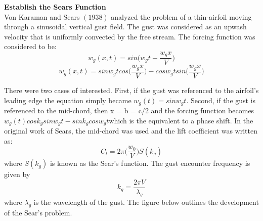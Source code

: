 \documentclass{article}
\begin{document}
\noindent \textbf{Establish the Sears Function}\\

\noindent Von Karaman and Sears $(1938)$ analyzed the problem of a thin-airfoil moving through a sinusoidal vertical gust field. The gust was considered as an upwash velocity that is uniformly convected by the free stream. The forcing function was considered to be: 
\begin{equation}
w_g(x,t) = sin\Bigg(w_gt - \frac{w_gx}{V}\Bigg)
\end{equation}
\begin{equation}
w_g(x,t) = sin w_gt cos\Bigg(\frac{w_gx}{V}\Bigg) - cos w_g t sin\Bigg(\frac{w_g x}{V}\Bigg)
\end{equation}

\noindent There were two cases of interested. First, if the gust was referenced to the airfoil's leading edge the equation simply became $w_g(t) = sinw_gt.$ Second, if the gust is referenced to the mid-chord, then x = b = c/2 and the forcing function becomes $w_g(t) cos k_g sin w_gt - sin k_g cos w_g t $which is the equivalent to a phase shift. In the original work of Sears, the mid-chord was used and the lift coefficient was written as: 
\begin{equation}
C_l = 2\pi \Bigg(\frac{w_0}{V}\Bigg)S(k_g)
\end{equation}
where $S(k_g)$ is known as the Sear's function. The gust encounter frequency is given by
\begin{equation}
k_g = \frac{2\pi V}{\lambda_g}
\end{equation}
where $\lambda_g$ is the wavelength of the gust. The figure below outlines the development of the Sear's problem. 
\end{document}
